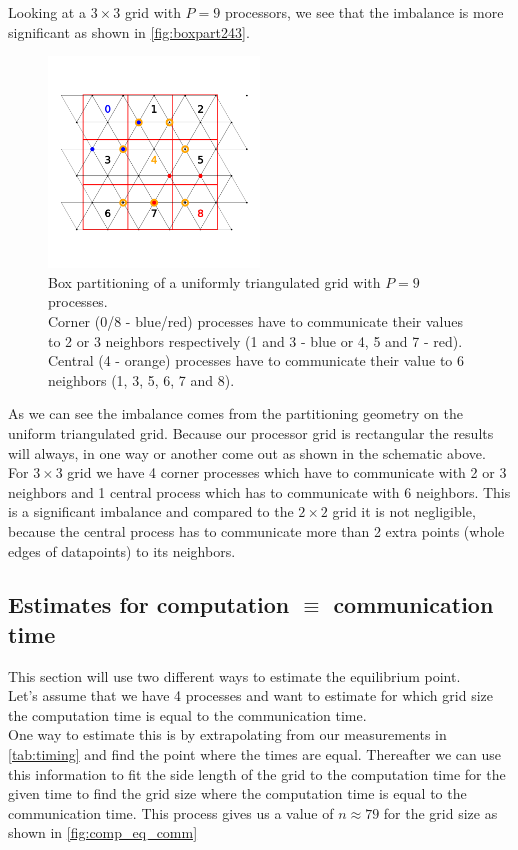 Looking at a $3\times3$ grid with $P=9$ processors, we see that the imbalance is more significant as shown in \autoref{fig:boxpart243}.\\
\begin{figure}[H]
    \centering
    \includegraphics[width=0.5\textwidth]{../fig/lab2/grid_3x3_partition.png}
    \caption{Box partitioning of a uniformly triangulated grid with $P=9$ processes.\\
    Corner (0/8 - blue/red) processes have to communicate their values to 2 or 3 neighbors respectively (1 and 3 - blue or 4, 5 and 7 - red).\\
    Central (4 - orange) processes have to communicate their value to 6 neighbors (1, 3, 5, 6, 7 and 8).}
    \label{fig:boxpart243}
\end{figure}
As we can see the imbalance comes from the partitioning geometry on the uniform triangulated grid. Because our processor grid is rectangular the results will always, in one way or another come out as shown in the schematic above.\\
For $3\times3$ grid we have 4 corner processes which have to communicate with 2 or 3 neighbors and 1 central process which has to communicate with 6 neighbors. This is a significant imbalance and compared to the $2\times2$ grid it is not negligible, because the central process has to communicate more than 2 extra points (whole edges of datapoints) to its neighbors.\\
\subsection{Estimates for computation $\equiv$ communication time}
 This section will use two different ways to estimate the equilibrium point.\\

Let's assume that we have 4 processes and want to estimate for which grid size the computation time is equal to the communication time. \\
One way to estimate this is by extrapolating from our measurements in \autoref{tab:timing} and find the point where the times are equal.
Thereafter we can use this information to fit the side length of the grid to the computation time for the given time to find the grid size where the computation time is equal to the communication time. This process gives us a value of $n\approx79$ for the grid size as shown in \autoref{fig:comp_eq_comm}\\

